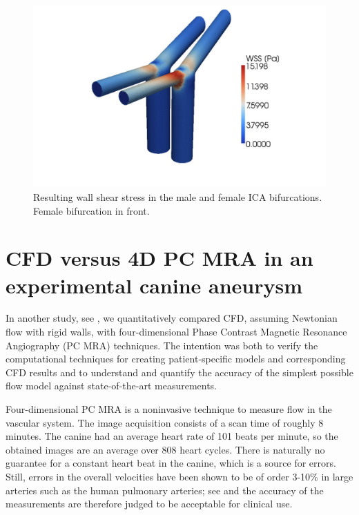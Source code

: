 \begin{figure}
  \centering
  \includegraphics[width=\largefig]{chapters/kvs-2/pdf/icas_wss.pdf}
  \caption{Resulting wall shear stress in the male and female ICA
    bifurcations. Female bifurcation in front.}
  \label{fig:kvs-2:ica_wss_res}
\end{figure}

\section{CFD versus 4D PC MRA in an experimental canine aneurysm} \label{dog_study}

In another study, see \citet{JiangJohnsonValen-SendstadEtAl2010}, we
quantitatively compared CFD, assuming Newtonian flow with rigid walls,
with four-dimensional Phase Contrast Magnetic Resonance Angiography
(PC MRA) techniques. The intention was both to verify the
computational techniques for creating patient-specific models and
corresponding CFD results and to understand and quantify the accuracy
of the simplest possible flow model against state-of-the-art
measurements.

Four-dimensional PC MRA is a noninvasive technique to measure flow in
the vascular system. The image acquisition consists of a scan time of
roughly 8 minutes. The canine had an average heart rate of 101 beats
per minute, so the obtained images are an average over 808 heart
cycles. There is naturally no guarantee for a constant heart beat in
the canine, which is a source for errors. Still, errors in
the overall velocities have been shown to
be of order 3-10\% in large arteries such as the human pulmonary arteries;
see \citet{LotzMeierLeppertEtAl2002,EvansIwaiGristEtAl1993} and
the accuracy of the measurements are therefore judged to be acceptable
for clinical use.

